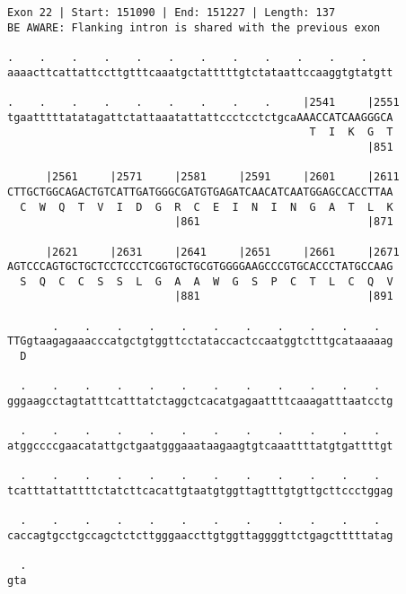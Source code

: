 \documentclass{article}
\begin{document}
\begin{Verbatim}
Exon 22 | Start: 151090 | End: 151227 | Length: 137
BE AWARE: Flanking intron is shared with the previous exon
 
.    .    .    .    .    .    .    .    .    .    .    .    
aaaacttcattattccttgtttcaaatgctatttttgtctataattccaaggtgtatgtt
  
.    .    .    .    .    .    .    .    .     |2541     |2551
tgaatttttatatagattctattaaatattattccctcctctgcaAAACCATCAAGGGCA
                                               T  I  K  G  T
                                                        |851
  
      |2561     |2571     |2581     |2591     |2601     |2611
CTTGCTGGCAGACTGTCATTGATGGGCGATGTGAGATCAACATCAATGGAGCCACCTTAA
  C  W  Q  T  V  I  D  G  R  C  E  I  N  I  N  G  A  T  L  K
                          |861                          |871
  
      |2621     |2631     |2641     |2651     |2661     |2671
AGTCCCAGTGCTGCTCCTCCCTCGGTGCTGCGTGGGGAAGCCCGTGCACCCTATGCCAAG
  S  Q  C  C  S  S  L  G  A  A  W  G  S  P  C  T  L  C  Q  V
                          |881                          |891
  
       .    .    .    .    .    .    .    .    .    .    .  
TTGgtaagagaaacccatgctgtggttcctataccactccaatggtctttgcataaaaag
  D                                                         
  
  .    .    .    .    .    .    .    .    .    .    .    .  
gggaagcctagtatttcatttatctaggctcacatgagaattttcaaagatttaatcctg
  
  .    .    .    .    .    .    .    .    .    .    .    .  
atggccccgaacatattgctgaatgggaaataagaagtgtcaaattttatgtgattttgt
  
  .    .    .    .    .    .    .    .    .    .    .    .  
tcatttattattttctatcttcacattgtaatgtggttagtttgtgttgcttccctggag
  
  .    .    .    .    .    .    .    .    .    .    .    .  
caccagtgcctgccagctctcttgggaaccttgtggttaggggttctgagctttttatag
  
  .
gta
\end{Verbatim}
\newpage
\end{document}
